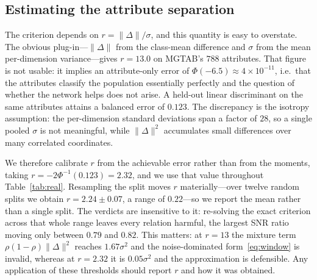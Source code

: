 \documentclass[../elsevier.tex]{subfiles}
\begin{document}
\subsection{Estimating the attribute separation}
\label{sec:r-estimate}

The criterion depends on $r = \|\Delta\|/\sigma$, and this quantity is easy to
overstate. The obvious plug-in---$\|\Delta\|$ from the class-mean difference and
$\sigma$ from the mean per-dimension variance---gives $r = 13.0$ on MGTAB's $788$
attributes. That figure is not usable: it implies an attribute-only error of
$\Phi(-6.5) \approx 4\times10^{-11}$, i.e.\ that the attributes classify the
population essentially perfectly and the question of whether the network helps does
not arise. A held-out linear discriminant on the same attributes attains a balanced
error of $0.123$. The discrepancy is the isotropy assumption: the per-dimension
standard deviations span a factor of $28$, so a single pooled $\sigma$ is not
meaningful, while $\|\Delta\|^2$ accumulates small differences over many correlated
coordinates.

We therefore calibrate $r$ from the achievable error rather than from the moments,
taking $r = -2\Phi^{-1}(0.123) = 2.32$, and we use that value throughout
Table~\ref{tab:real}. Resampling the split moves $r$ materially---over twelve random splits we obtain $r = 2.24 \pm 0.07$, a range of $0.22$---so we report the mean rather than a single split. The verdicts are insensitive to it: re-solving the exact criterion across that whole range leaves every relation harmful, the largest SNR ratio moving only between $0.79$ and $0.82$. This matters: at $r = 13$ the mixture term
$\rho(1-\rho)\|\Delta\|^2$ reaches $1.67\sigma^2$ and the noise-dominated
form~\eqref{eq:window} is invalid, whereas at $r = 2.32$ it is $0.05\sigma^2$ and the
approximation is defensible. Any application of these thresholds should report $r$
and how it was obtained.
\end{document}

